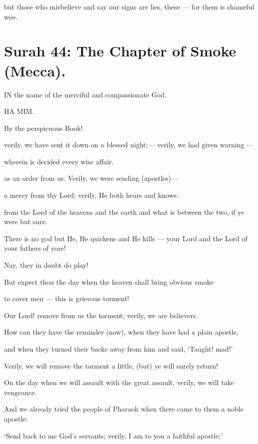 \documentclass[fontsize=14pt, letterpaper, notitlepage, openany, DIV=12]{scrbook} %
\begin{document}
\noindent[22:57]
but those who misbelieve and say our signs are lies, these --- for them is shameful woe.


\section{Surah 44: The Chapter of Smoke (Mecca).}


IN the name of the merciful and compassionate God.

\noindent[44:1]
HA MIM.

\noindent[44:2]
By the perspicuous Book!

\noindent[44:3]
verily, we have sent it down on a blessed night;--- verily, we had given warning ---

\noindent[44:4]
wherein is decided every wise affair,

\noindent[44:5]
as an order from us. Verily, we were sending (apostles)---

\noindent[44:6]
a mercy from thy Lord; verily, He both hears and knows:

\noindent[44:7]
from the Lord of the heavens and the earth and what is between the two, if ye were but
sure.

\noindent[44:8]
There is no god but He, He quickens and He kills --- your Lord and the Lord of your
fathers of yore!

\noindent[44:9]
Nay, they in doubt do play!

\noindent[44:10]
But expect thou the day when the heaven shall bring obvious smoke

\noindent[44:11]
to cover men --- this is grievous torment!

\noindent[44:12]
Our Lord! remove from us the torment; verily, we are believers.

\noindent[44:13]
How can they have the reminder (now), when they have had a plain apostle,

\noindent[44:14]
and when they turned their backs away from him and said, `Taught! mad!'

\noindent[44:15]
Verily, we will remove the torment a little, (but) ye will surely return!

\noindent[44:16]
On the day when we will assault with the great assault, verily, we will take vengeance.

\noindent[44:17]
And we already tried the people of Pharaoh when there came to them a noble apostle:

\noindent[44:18]
`Send back to me God's servants; verily, I am to you a faithful apostle;'
\end{document}
